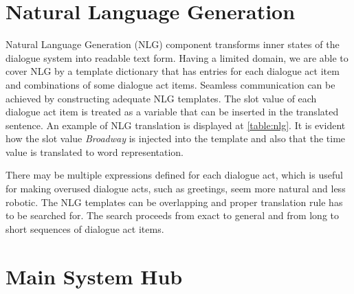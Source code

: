 \section{Natural Language Generation}

Natural Language Generation (NLG) component transforms inner states of the dialogue system into readable text form.
Having a limited domain, we are able to cover NLG by a template dictionary that has entries for each dialogue act item and combinations of some dialogue act items.
Seamless communication can be achieved by constructing adequate NLG templates.
The slot value of each dialogue act item is treated as a variable that can be inserted in the translated sentence.
An example of NLG translation is displayed at \ref{table:nlg}.
It is evident how the slot value \textit{Broadway} is injected into the template and also that the time value is translated to word representation.

\begin{table}[h]
\centering
\small
\hspace*{-3pt}
\caption[NLG conversion of DA to sentence]{Translation example of dialogue act to sentence by Natural Language Generation component}
\label{table:nlg}
\end{table}

There may be multiple expressions defined for each dialogue act, which is useful for making overused dialogue acts, such as greetings, seem more natural and less robotic.
The NLG templates can be overlapping and proper translation rule has to be searched for.
The search proceeds from exact to general and from long to short sequences of dialogue act items.

\section{Main System Hub}

